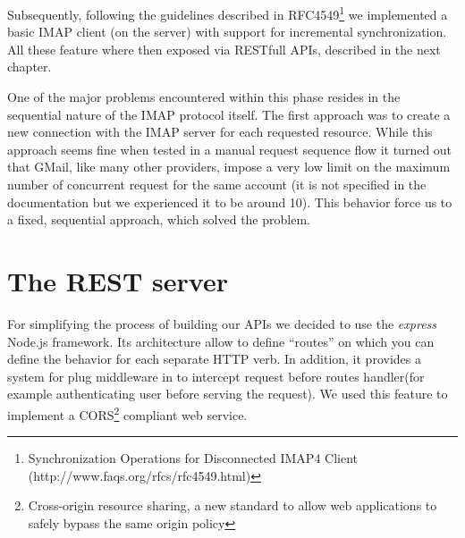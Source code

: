 \documentclass[a4paper,12pt]{report}
\begin{document}
Subsequently, following the guidelines described in RFC4549\footnote{Synchronization Operations for Disconnected IMAP4 Client (http://www.faqs.org/rfcs/rfc4549.html)} we implemented a basic IMAP client (on the server) with support for incremental synchronization. 
All these feature where then exposed via RESTfull APIs, described in the next chapter.

One of the major problems encountered within this phase resides in the sequential nature of the IMAP protocol itself. The first approach was to create a new connection with the IMAP server for each requested resource. While this approach seems fine when tested in a manual request sequence flow it turned out that GMail, like many other providers, impose a very low limit on the maximum number of concurrent request for the same account (it is not specified in the documentation but we experienced it to be around 10). This behavior force us to a fixed, sequential approach, which solved the problem.

\section{The REST server}
For simplifying the process of building our APIs we decided to use the \emph{express} Node.js framework.
Its architecture allow to define ``routes'' on which you can define the behavior for each separate HTTP verb. In addition, it provides a system for plug middleware in to intercept request before routes handler(for example authenticating user before serving the request). We used this feature to implement a CORS\footnote{Cross-origin resource sharing, a new standard to allow web applications to safely bypass the same origin policy} compliant web service.
\end{document}
